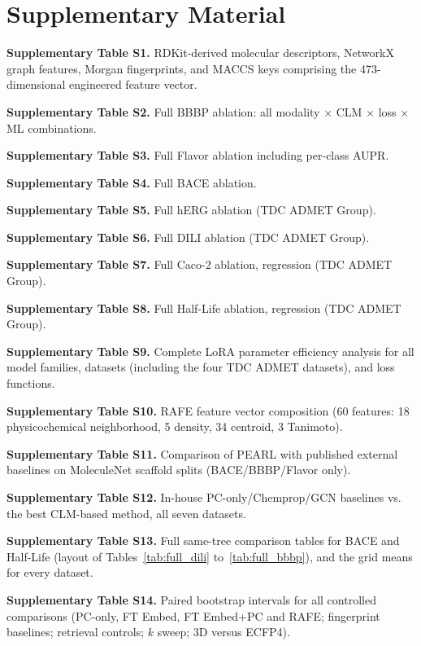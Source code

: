 \documentclass[pdflatex,sn-mathphys-num]{sn-jnl}%
\begin{document}
\section*{Supplementary Material}\label{sec:supplementary}

\noindent\textbf{Supplementary Table S1.} RDKit-derived molecular descriptors, NetworkX graph features, Morgan fingerprints, and MACCS keys comprising the 473-dimensional engineered feature vector.

\noindent\textbf{Supplementary Table S2.} Full BBBP ablation: all modality $\times$ CLM $\times$ loss $\times$ ML combinations.

\noindent\textbf{Supplementary Table S3.} Full Flavor ablation including per-class AUPR.

\noindent\textbf{Supplementary Table S4.} Full BACE ablation.

\noindent\textbf{Supplementary Table S5.} Full hERG ablation (TDC ADMET Group).

\noindent\textbf{Supplementary Table S6.} Full DILI ablation (TDC ADMET Group).

\noindent\textbf{Supplementary Table S7.} Full Caco-2 ablation, regression (TDC ADMET Group).

\noindent\textbf{Supplementary Table S8.} Full Half-Life ablation, regression (TDC ADMET Group).

\noindent\textbf{Supplementary Table S9.} Complete LoRA parameter efficiency analysis for all model families, datasets (including the four TDC ADMET datasets), and loss functions.

\noindent \textbf{Supplementary Table S10.} RAFE feature vector composition (60 features: 18 physicochemical neighborhood, 5 density, 34 centroid, 3 Tanimoto).

\noindent \textbf{Supplementary Table S11.} Comparison of PEARL with published external baselines on MoleculeNet scaffold splits (BACE/BBBP/Flavor only).

\noindent \textbf{Supplementary Table S12.} In-house PC-only/Chemprop/GCN baselines vs. the best CLM-based method, all seven datasets.

\noindent \textbf{Supplementary Table S13.} Full same-tree comparison tables for BACE and Half-Life (layout of Tables~\ref{tab:full_dili} to~\ref{tab:full_bbbp}), and the grid means for every dataset.

\noindent \textbf{Supplementary Table S14.} Paired bootstrap intervals for all controlled comparisons (PC-only, FT Embed, FT Embed+PC and RAFE; fingerprint baselines; retrieval controls; $k$ sweep; 3D versus ECFP4).
\end{document}
